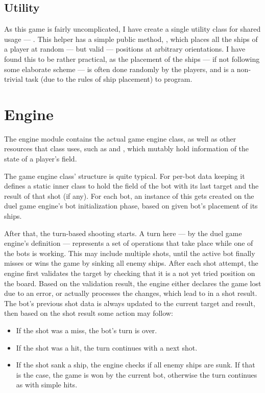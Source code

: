 			\subsection{Utility}
			
			As this game is fairly uncomplicated, I have create a single utility class for shared usage --- . This helper has a simple public method, , which places all the ships of a player at random --- but valid --- positions at arbitrary orientations. I have found this to be rather practical, as the placement of the ships --- if not following some elaborate scheme --- is often done randomly by the players, and is a non-trivial task (due to the rules of ship placement) to program.
		
		\section{Engine}		

		The engine module contains the actual game engine class, as well as other resources that class uses, such as  and , which mutably hold information of the state of a player's field.

		The game engine class' structure is quite typical. For per-bot data keeping it defines a static inner class to hold the field of the bot with its last target and the result of that shot (if any). For each bot, an instance of this gets created on the duel game engine's bot initialization phase, based on given bot's placement of its ships.
		
		After that, the turn-based shooting starts. A turn here --- by the duel game engine's definition --- represents a set of operations that take place while one of the bots is working. This may include multiple shots, until the active bot finally misses or wins the game by sinking all enemy ships. After each shot attempt, the engine first validates the target by checking that it is a not yet tried position on the board. Based on the validation result, the engine either declares the game lost due to an error, or actually processes the changes, which lead to in a shot result. The bot's previous shot data is always updated to the current target and result, then based on the shot result some action may follow: 
		
		\begin{itemize}
		
			\item If the shot was a miss, the bot's turn is over.
			
			\item If the shot was a hit, the turn continues with a next shot.
			
			\item If the shot sank a ship, the engine checks if all enemy ships are sunk. If that is the case, the game is won by the current bot, otherwise the turn continues as with simple hits.
		
		\end{itemize}

